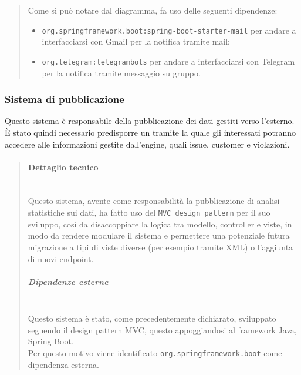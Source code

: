 \begin{quote}
\begin{center}
                        \end{center}
                        Come si può notare dal diagramma, fa uso delle seguenti dipendenze:
                        \begin{itemize}
                            \item \texttt{org.springframework.boot:spring-boot-starter-mail} per andare a interfacciarsi con Gmail per la notifica tramite mail;
                            \item \texttt{org.telegram:telegrambots} per andare a interfacciarsi con Telegram per la notifica tramite messaggio su gruppo.
                        \end{itemize} 
            \end{quote}
        \subsubsection{Sistema di pubblicazione}
            Questo sistema è responsabile della pubblicazione dei dati gestiti verso l'esterno.\\
            È stato quindi necessario predisporre un  tramite la quale gli interessati potranno accedere alle informazioni gestite dall'engine, quali issue, customer e violazioni. \\
            \begin{quote}
            	\mbox{}%
            	\vspace{-1cm}
                \paragraph{Dettaglio tecnico}
                	 \mbox{}\\
                    Questo sistema, avente come responsabilità la pubblicazione di analisi statistiche sui dati, ha fatto uso del \texttt{MVC design pattern} per il suo sviluppo, così da disaccoppiare la logica tra modello, controller e viste, in modo da rendere modulare il sistema e permettere una potenziale futura migrazione a tipi di viste diverse (per esempio tramite XML) o l'aggiunta di nuovi endpoint.\\
                    \subparagraph{Dipendenze esterne}
                    \mbox{} \\
                        Questo sistema è stato, come precedentemente dichiarato, sviluppato seguendo il design pattern MVC, questo appoggiandosi al framework Java, Spring Boot. \\
                        Per questo motivo viene identificato \texttt{org.springframework.boot} come dipendenza esterna. 
            \end{quote}
        \newpage
